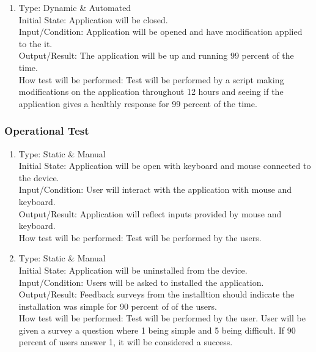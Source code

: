 \documentclass[12pt, titlepage]{article}
\begin{document}
\begin{adjustwidth}{2.2em}{0pt}
\begin{enumerate}[{NF-PT}1.]
    \item Type: Dynamic \& Automated\\
    Initial State: Application will be closed.\\
    Input/Condition: Application will be opened and have modification applied to the it.\\
    Output/Result: The application will be up and running 99 percent of the time.\\
    How test will be performed: Test will be performed by a script making modifications on the application throughout 12 hours and seeing if the application gives a healthly response for 99 percent of the time.
\end{enumerate}
\end{adjustwidth}

\subsubsection{Operational Test}

\begin{adjustwidth}{2.2em}{0pt}
\begin{enumerate}[{NF-OT}1.]
    \item Type: Static \& Manual\\
    Initial State: Application will be open with keyboard and mouse connected to the device.\\
    Input/Condition: User will interact with the application with mouse and keyboard.\\
    Output/Result: Application will reflect inputs provided by mouse and keyboard.\\
    How test will be performed: Test will be performed by the users.
    
    \item Type: Static \& Manual\\
    Initial State: Application will be uninstalled from the device.\\
    Input/Condition: Users will be asked to installed the application.\\
    Output/Result: Feedback surveys from the installtion should indicate the installation was simple for 90 percent of of the users.\\
    How test will be performed: Test will be performed by the user. User will be given a survey a question where 1 being simple and 5 being difficult. If 90 percent of users answer 1, it will be considered a success.
\end{enumerate}
\end{adjustwidth}
\end{document}
